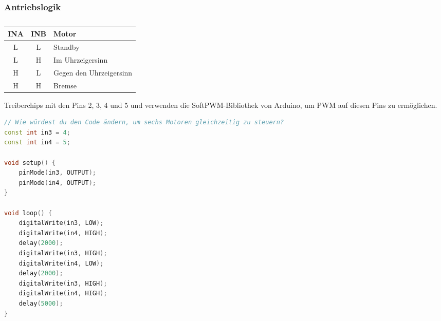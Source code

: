 \documentclass{vorlage-design-main}
\begin{document}
\hypertarget{antriebslogik}{%
\subsubsection{Antriebslogik}\label{antriebslogik}}

\begin{table}[!ht]
\caption{}%
\begin{tabular}{@{}ccl@{}}

\toprule
INA & INB & Motor \\
\midrule[\heavyrulewidth]

L & L & Standby \\
L & H & Im Uhrzeigersinn \\
H & L & Gegen den Uhrzeigersinn \\
H & H & Bremse \\
\bottomrule

\end{tabular}
\floatnotes{}
\end{table}

Treiberchips mit den Pins 2, 3, 4 und 5 und verwenden die
SoftPWM-Bibliothek von Arduino, um PWM auf diesen Pins zu ermöglichen.

\begin{lstlisting}[language={C++}]
// Wie würdest du den Code ändern, um sechs Motoren gleichzeitig zu steuern?
const int in3 = 4;
const int in4 = 5;

void setup() {
    pinMode(in3, OUTPUT);
    pinMode(in4, OUTPUT);
}

void loop() {
    digitalWrite(in3, LOW);
    digitalWrite(in4, HIGH);
    delay(2000);
    digitalWrite(in3, HIGH);
    digitalWrite(in4, LOW);
    delay(2000);
    digitalWrite(in3, HIGH);
    digitalWrite(in4, HIGH);
    delay(5000);
}
\end{lstlisting}
\end{document}
